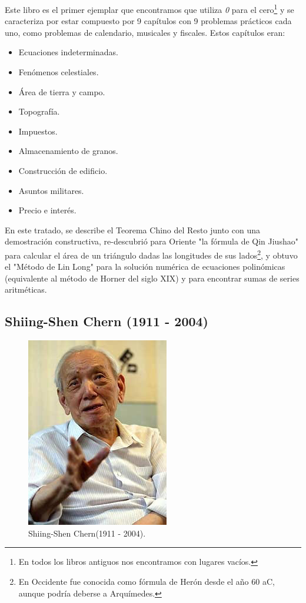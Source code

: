 \documentclass[a4paper, 11pt]{article}
\begin{document}
		Este libro es el primer ejemplar que encontramos que utiliza \textit{0} para el cero\footnote{En todos los libros
		antiguos nos encontramos con lugares vacíos.} y se caracteriza por estar compuesto por 9 capítulos con 9 problemas
		prácticos cada uno, como problemas de calendario, musicales y fiscales. Estos capítulos eran:
		\begin{itemize}
			\item Ecuaciones indeterminadas.
			\item Fenómenos celestiales.
			\item Área de tierra y campo.
			\item Topografía.
			\item Impuestos.
			\item Almacenamiento de granos.
			\item Construcción de edificio.
			\item Asuntos militares.
			\item Precio e interés.
		\end{itemize}
		
		En este tratado, se describe el Teorema Chino del Resto junto con una demostración constructiva, re-descubrió
		para Oriente "la fórmula de Qin Jiushao" para calcular el área de un triángulo dadas las longitudes de sus
		lados\footnote{En Occidente fue conocida como fórmula de Herón desde el año 60 aC, aunque podría deberse a
		Arquímedes.}, y obtuvo el "Método de Lin Long" para la solución numérica de ecuaciones polinómicas (equivalente
		al método de Horner del siglo XIX) y para encontrar sumas de series aritméticas.
	
	\subsection{Shiing-Shen Chern (1911 - 2004)}
		\begin{figure}[!ht]
			\centering
			\includegraphics{shiing-shen_chern.jpg}
			\caption{Shiing-Shen Chern(1911 - 2004).}
			\label{fig:shiing-shen_chern}
		\end{figure}
\end{document}
